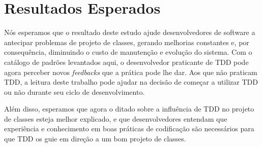 \section{Resultados Esperados}

Nós esperamos que o resultado deste estudo ajude desenvolvedores de software a antecipar
problemas de projeto de classes, gerando melhorias constantes e, por consequência, 
diminuindo o custo de manutenção e evolução do sistema.
Com o catálogo de padrões levantados aqui, o desenvolvedor praticante de TDD pode agora 
perceber novos \textit{feedbacks} que a prática pode lhe dar. Aos que não praticam TDD,
a leitura deste trabalho pode ajudar na decisão de começar a utilizar TDD ou não durante
seu ciclo de desenvolvimento.

Além disso, esperamos que agora o ditado sobre a influência de TDD no projeto de classes esteja
melhor explicado, e que desenvolvedores entendam que experiência e conhecimento em boas 
práticas de codificação são necessários para que TDD os guie em direção a um bom
projeto de classes.

